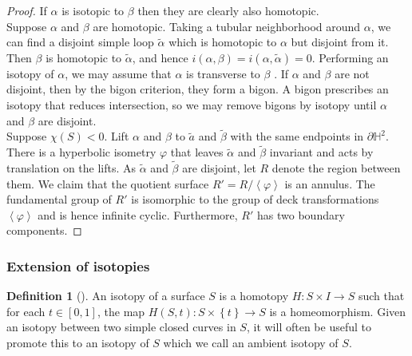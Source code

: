 \documentclass[reqno]{amsart}
\theoremstyle{definition}
\newtheorem{definition}[theorem]{Definition}
\theoremstyle{remark}
\begin{document}
\begin{proof}
    If $\alpha$ is isotopic to $\beta$ then they are clearly also
    homotopic.\\
    \linebreak
    Suppose $\alpha$ and $\beta$ are homotopic. Taking a
    tubular neighborhood around $\alpha$, we can find
    a disjoint simple loop $\tilde{\alpha}$ which is homotopic to
    $\alpha$ but disjoint from it. Then $\beta$ is homotopic
    to $\tilde{\alpha}$, and hence
    $i \left( \alpha, \beta \right) 
    = i \left( \alpha, \tilde{\alpha} \right) = 0$.
    Performing an isotopy of $\alpha$, we may assume that
    $\alpha$ is transverse to $\beta$ .
    If $\alpha$ and $\beta$ are not disjoint, then by
    the bigon criterion, they form a bigon. A bigon
    prescribes an isotopy that reduces intersection, so we
    may remove bigons by isotopy until $\alpha$ and $\beta$ are
    disjoint.\\
    \linebreak
    Suppose $\chi (S) <0$. Lift $\alpha$ and $\beta$ to
    $\tilde{a}$ and $\tilde{\beta}$ with the
    same endpoints in $\partial \mathbb{H}^2$. There
    is a hyperbolic isometry $\varphi$ that leaves
    $\tilde{\alpha}$ and $\tilde{\beta}$ invariant and
    acts by translation on the lifts. As $\tilde{\alpha}$ and
    $\tilde{\beta}$ are disjoint, let $R$ denote the region
    between them. We claim that the quotient surface
    $R' = R / \left<\varphi \right>$ is an annulus.
    The fundamental group of $R'$ is isomorphic to the group of
    deck transformations $\left<\varphi \right>$ and is hence
    infinite cyclic. Furthermore, $R'$ has two boundary components.
\end{proof}


\subsubsection*{Extension of isotopies}

\begin{definition}[]
    An isotopy of a surface $S$ is a homotopy $H \colon 
    S \times I \to S$ such that for each
    $t \in \left[ 0,1 \right] $, the map
    $H \left( S, t \right) \colon S \times \left\{ t \right\} \to 
    S$ is a homeomorphism. Given an isotopy between
    two simple closed curves in $S$, it will often be useful
    to promote this to an isotopy of $S$ which we call an
    ambient isotopy of $S$.
\end{definition}
\end{document}
